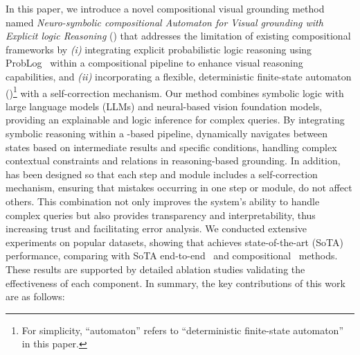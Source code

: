 In this paper, we introduce a novel compositional visual grounding method named \emph{Neuro-symbolic compositional Automaton for Visual grounding with Explicit logic Reasoning} (\methodname{}) that addresses the limitation of existing compositional frameworks by \emph{(i)} integrating explicit probabilistic logic reasoning using ProbLog~\cite{de_raedt_problog_2007} within a compositional pipeline to enhance visual reasoning capabilities, and \emph{(ii)} incorporating a flexible, deterministic finite-state automaton (\dfa)\footnote{For simplicity, ``automaton'' refers to ``deterministic finite-state automaton'' in this paper.} with a self-correction mechanism.
Our method combines symbolic logic with large language models (LLMs) and neural-based vision foundation models, providing an explainable and logic inference for complex queries. By integrating symbolic reasoning within a \dfa-based pipeline, \methodname{} dynamically navigates between states based on intermediate results and specific conditions, handling complex contextual constraints and relations in reasoning-based grounding. In addition, \methodname{} has been designed so that each step and module includes a self-correction mechanism, ensuring that mistakes occurring in one step or module, do not affect others. This combination not only improves the system's ability to handle complex queries but also provides transparency and interpretability, thus increasing trust and facilitating error analysis. We conducted extensive experiments on popular datasets, showing that \methodname{} achieves state-of-the-art (SoTA) performance, comparing with SoTA end-to-end~\cite{li_grounded_2022, liu_grounding_2023, peng_kosmos-2_2023, dai_simvg_2024, xiao_florence-2_2024} and compositional~\cite{stanic_towards_2024, suris_vipergpt_2023, ke_hydra_2024} methods. These results are supported by detailed ablation studies validating the effectiveness of each component.
In summary, the key contributions of this work are as follows: 
